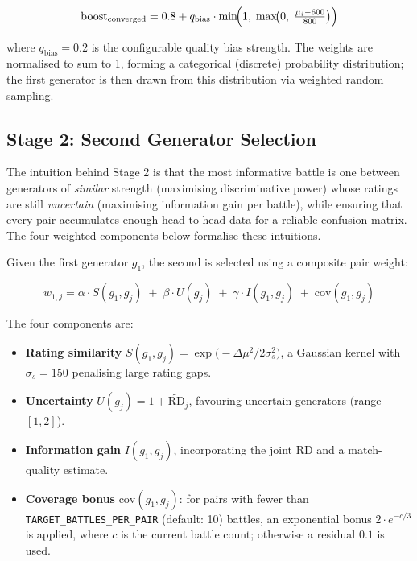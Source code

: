 \documentclass[shortabstract, mgr, english]{iithesis}
\begin{document}
\begin{equation}
\text{boost}_{\text{converged}} = 0.8 + q_{\text{bias}} \cdot
\min\!\Bigl(1,\;\max\!\bigl(0,\;\tfrac{\mu_i - 600}{800}\bigr)\Bigr)
\end{equation}

where $q_{\text{bias}} = 0.2$ is the configurable quality bias strength. The weights
are normalised to sum to 1, forming a categorical (discrete) probability distribution;
the first generator is then drawn from this distribution via weighted random sampling.

\subsection{Stage 2: Second Generator Selection}
\label{subsec:sd-agis-stage2}

The intuition behind Stage 2 is that the most informative battle is one between
generators of \emph{similar} strength (maximising discriminative power) whose ratings
are still \emph{uncertain} (maximising information gain per battle), while ensuring
that every pair accumulates enough head-to-head data for a reliable confusion matrix.
The four weighted components below formalise these intuitions.

Given the first generator $g_1$, the second is selected using a composite pair weight:

\begin{equation}
\label{eq:agis-w2}
w_{1,j} = \alpha \cdot S(g_1, g_j) \;+\; \beta \cdot U(g_j) \;+\;
           \gamma \cdot I(g_1, g_j) \;+\; \text{cov}(g_1, g_j)
\end{equation}

The four components are:

\begin{itemize}
    \item \textbf{Rating similarity} $S(g_1, g_j) = \exp\!\bigl(-\Delta\mu^2 / 2\sigma_s^2\bigr)$,
          a Gaussian kernel with $\sigma_s = 150$ penalising large rating gaps.
    \item \textbf{Uncertainty} $U(g_j) = 1 + \widetilde{\text{RD}}_j$, favouring
          uncertain generators (range $[1, 2]$).
    \item \textbf{Information gain} $I(g_1, g_j)$, incorporating the joint RD
          and a match-quality estimate.
    \item \textbf{Coverage bonus} $\text{cov}(g_1, g_j)$: for pairs with fewer than
          \texttt{TARGET\_BATTLES\_PER\_PAIR} (default: 10) battles, an exponential
          bonus $2 \cdot e^{-c/3}$ is applied, where $c$ is the current battle count;
          otherwise a residual $0.1$ is used.
\end{itemize}
\end{document}
